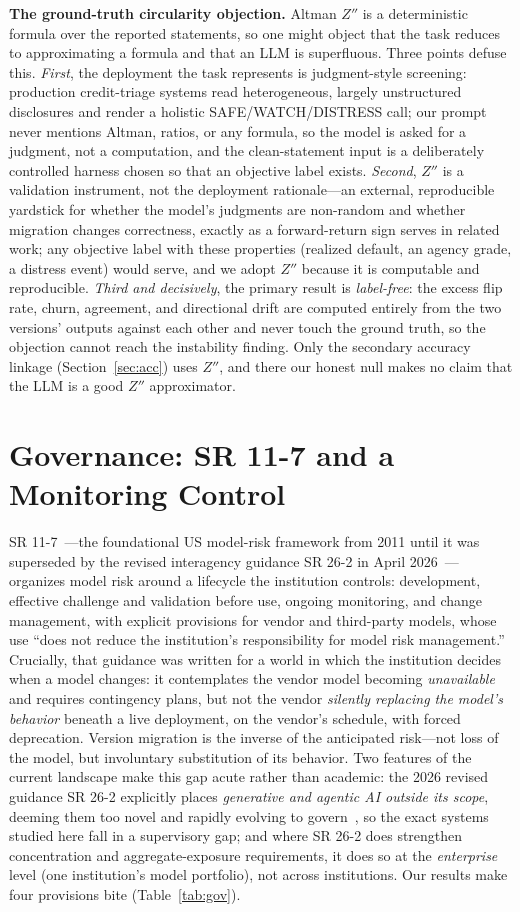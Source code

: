 \documentclass[10pt,twocolumn]{article}
\begin{document}
\noindent\textbf{The ground-truth circularity objection.} Altman $Z''$ is a deterministic formula over the reported statements, so one might object that the task reduces to approximating a formula and that an LLM is superfluous. Three points defuse this. \emph{First}, the deployment the task represents is judgment-style screening: production credit-triage systems read heterogeneous, largely unstructured disclosures and render a holistic SAFE/WATCH/DISTRESS call; our prompt never mentions Altman, ratios, or any formula, so the model is asked for a judgment, not a computation, and the clean-statement input is a deliberately controlled harness chosen so that an objective label exists. \emph{Second}, $Z''$ is a validation instrument, not the deployment rationale---an external, reproducible yardstick for whether the model's judgments are non-random and whether migration changes correctness, exactly as a forward-return sign serves in related work; any objective label with these properties (realized default, an agency grade, a distress event) would serve, and we adopt $Z''$ because it is computable and reproducible. \emph{Third and decisively}, the primary result is \emph{label-free}: the excess flip rate, churn, agreement, and directional drift are computed entirely from the two versions' outputs against each other and never touch the ground truth, so the objection cannot reach the instability finding. Only the secondary accuracy linkage (Section~\ref{sec:acc}) uses $Z''$, and there our honest null makes no claim that the LLM is a good $Z''$ approximator.

\section{Governance: SR 11-7 and a Monitoring Control}
SR 11-7~\cite{sr117}---the foundational US model-risk framework from 2011 until it was superseded by the revised interagency guidance SR 26-2 in April 2026~\cite{sr2602}---organizes model risk around a lifecycle the institution controls: development, effective challenge and validation before use, ongoing monitoring, and change management, with explicit provisions for vendor and third-party models, whose use ``does not reduce the institution's responsibility for model risk management.'' Crucially, that guidance was written for a world in which the institution decides when a model changes: it contemplates the vendor model becoming \emph{unavailable} and requires contingency plans, but not the vendor \emph{silently replacing the model's behavior} beneath a live deployment, on the vendor's schedule, with forced deprecation. Version migration is the inverse of the anticipated risk---not loss of the model, but involuntary substitution of its behavior. Two features of the current landscape make this gap acute rather than academic: the 2026 revised guidance SR 26-2 explicitly places \emph{generative and agentic AI outside its scope}, deeming them too novel and rapidly evolving to govern~\cite{sr2602}, so the exact systems studied here fall in a supervisory gap; and where SR 26-2 does strengthen concentration and aggregate-exposure requirements, it does so at the \emph{enterprise} level (one institution's model portfolio), not across institutions. Our results make four provisions bite (Table~\ref{tab:gov}).
\end{document}
